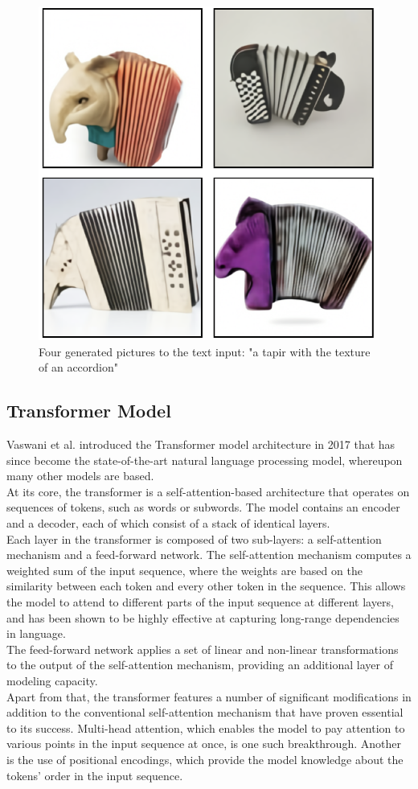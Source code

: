 \documentclass[10pt,twocolumn,twoside]{osajnl}
\begin{document}
\begin{figure}[htbp]
	\centering
	\includegraphics[width=.7\linewidth]{images/DallEExampleTapir.png}
	\caption{Four generated pictures to the text input: "a tapir with the texture of an accordion" \cite{zeroShot}}
	\label{exampleTapir}
\end{figure}

\subsection{Transformer Model}
Vaswani et al. introduced the Transformer model architecture in 2017 \cite{transformer} that has since become the state-of-the-art natural language processing model, whereupon many other models are based.\\
At its core, the transformer is a self-attention-based architecture that operates on sequences of tokens, such as words or subwords. The model contains an encoder and a decoder, each of which consist of a stack of identical layers.\\
Each layer in the transformer is composed of two sub-layers: a self-attention mechanism and a feed-forward network. The self-attention mechanism computes a weighted sum of the input sequence, where the weights are based on the similarity between each token and every other token in the sequence. This allows the model to attend to different parts of the input sequence at different layers, and has been shown to be highly effective at capturing long-range dependencies in language.\\
The feed-forward network applies a set of linear and non-linear transformations to the output of the self-attention mechanism, providing an additional layer of modeling capacity. \\
Apart from that, the transformer features a number of significant modifications in addition to the conventional self-attention mechanism that have proven essential to its success. Multi-head attention, which enables the model to pay attention to various points in the input sequence at once, is one such breakthrough. Another is the use of positional encodings, which provide the model knowledge about the tokens' order in the input sequence.
\end{document}
